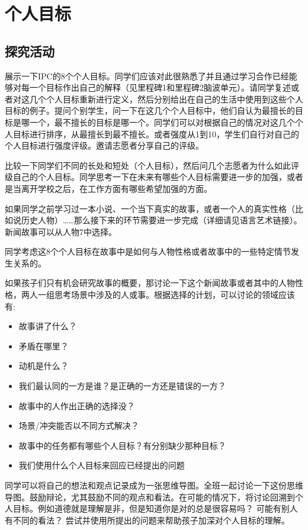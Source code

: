 \chapter{个人目标}

\section{探究活动}
     展示一下IPC的8个个人目标。同学们应该对此很熟悉了并且通过学习合作已经能够对每一个目标作出自己的解释（见里程碑1和里程碑2脑波单元）。请同学复述或者对这几个个人目标重新进行定义，然后分别给出在自己的生活中使用到这些个人目标的例子。提问个别学生，问一下在这几个个人目标中，他们自认为最擅长的目标是哪一个，最不擅长的目标是哪一个。同学们可以对根据自己的情况对这几个个人目标进行排序，从最擅长到最不擅长。或者强度从1到10，学生们自行对自己的个人目标进行强度评级。邀请志愿者分享自己的评级。\par
     比较一下同学们不同的长处和短处（个人目标），然后问几个志愿者为什么如此评级自己的个人目标。同学思考一下在未来有哪些个人目标需要进一步的加强，或者是当离开学校之后，在工作方面有哪些希望加强的方面。\par
     如果同学之前学习过一本小说、一个当下真实的故事，或者一个人的真实性格（比如说历史人物）……那么接下来的环节需要进一步完成（详细请见语言艺术链接）。新闻故事可以从人物7中选择。\par
     同学考虑这8个个人目标在故事中是如何与人物性格或者故事中的一些特定情节发生关系的。\par
     如果孩子们只有机会研究故事的概要，那讨论一下这个新闻故事或者其中的人物性格，两人一组思考场景中涉及的人或事。根据选择的计划，可以讨论的领域应该有:\par
     \begin{itemize}
       \item 故事讲了什么？
       \item 矛盾在哪里？
       \item 动机是什么？  
       \item 我们最认同的一方是谁？是正确的一方还是错误的一方？
       \item 故事中的人作出正确的选择没？
       \item 场景/冲突能否以不同方式解决？ 
       \item 故事中的任务都有哪些个人目标？有分别缺少那种目标？
       \item 我们使用什么个人目标来回应已经提出的问题
      \end{itemize} 
     同学可以将自己的想法和观点记录成为一张思维导图。全班一起讨论一下这份思维导图。鼓励辩论，尤其鼓励不同的观点和看法。在可能的情况下，将讨论回溯到个人目标。例如道德就是理解是非，但是知道你是对的总是很容易吗？ 可能有别人有不同的看法？ 尝试并使用所提出的问题来帮助孩子加深对个人目标的理解。\par
     
